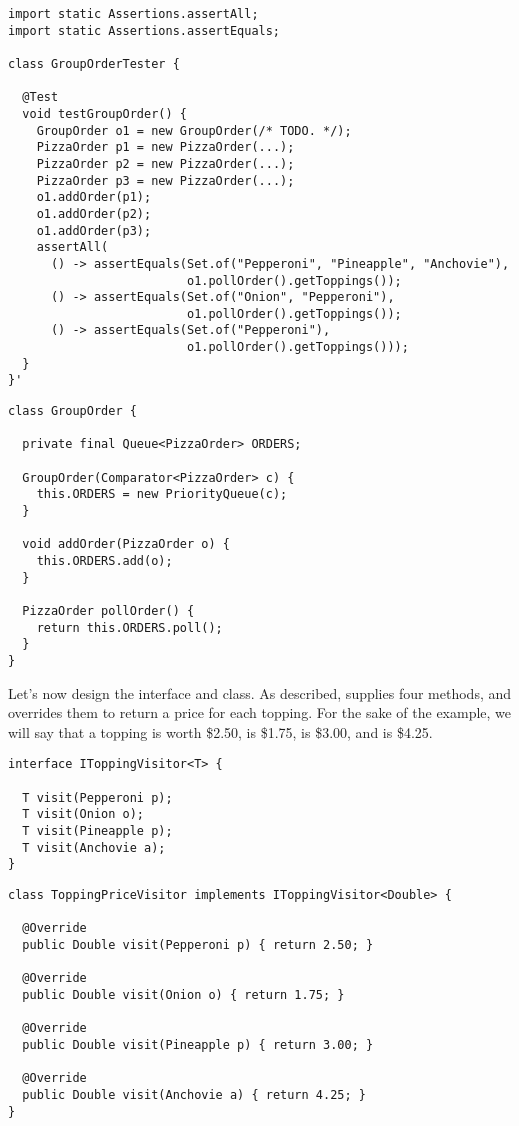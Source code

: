 \begin{lstlisting}[language=MyJava]
import static Assertions.assertAll;
import static Assertions.assertEquals;

class GroupOrderTester {

  @Test
  void testGroupOrder() {
    GroupOrder o1 = new GroupOrder(/* TODO. */);
    PizzaOrder p1 = new PizzaOrder(...);
    PizzaOrder p2 = new PizzaOrder(...);
    PizzaOrder p3 = new PizzaOrder(...);
    o1.addOrder(p1);
    o1.addOrder(p2);
    o1.addOrder(p3);
    assertAll(
      () -> assertEquals(Set.of("Pepperoni", "Pineapple", "Anchovie"), 
                         o1.pollOrder().getToppings());
      () -> assertEquals(Set.of("Onion", "Pepperoni"),
                         o1.pollOrder().getToppings());                 
      () -> assertEquals(Set.of("Pepperoni"),
                         o1.pollOrder().getToppings()));
  }
}'
\end{lstlisting}

\begin{lstlisting}[language=MyJava]
class GroupOrder {

  private final Queue<PizzaOrder> ORDERS;

  GroupOrder(Comparator<PizzaOrder> c) {
    this.ORDERS = new PriorityQueue(c);
  }

  void addOrder(PizzaOrder o) {
    this.ORDERS.add(o);
  }

  PizzaOrder pollOrder() {
    return this.ORDERS.poll();
  }
}
\end{lstlisting}

Let's now design the  interface and  class.
As described,  supplies four methods, and  overrides them to return a price for each topping.
For the sake of the example, we will say that a  topping is worth \$2.50,  is \$1.75,  is \$3.00, and  is \$4.25.

\begin{lstlisting}[language=MyJava]
interface IToppingVisitor<T> {

  T visit(Pepperoni p);
  T visit(Onion o);
  T visit(Pineapple p);
  T visit(Anchovie a);
}
\end{lstlisting}

\begin{lstlisting}[language=MyJava]
class ToppingPriceVisitor implements IToppingVisitor<Double> {

  @Override 
  public Double visit(Pepperoni p) { return 2.50; }

  @Override 
  public Double visit(Onion o) { return 1.75; }

  @Override
  public Double visit(Pineapple p) { return 3.00; }

  @Override
  public Double visit(Anchovie a) { return 4.25; }
}
\end{lstlisting}